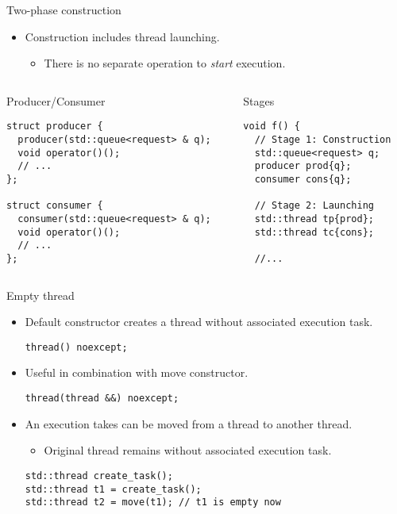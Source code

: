 \begin{frame}[t,fragile]{Two-phase construction}
\begin{itemize}
  \item Construction includes thread launching.
    \begin{itemize}
      \item There is no separate operation to \emph{start} execution.
    \end{itemize}
\end{itemize}
\begin{columns}

\begin{column}{.5\textwidth}
\begin{block}{Producer/Consumer}
\begin{lstlisting}
struct producer {
  producer(std::queue<request> & q);
  void operator()();
  // ...
};

struct consumer {
  consumer(std::queue<request> & q);
  void operator()();
  // ...
};
\end{lstlisting}
\end{block}
\end{column}

\begin{column}{.5\textwidth}
\begin{block}{Stages}
\begin{lstlisting}
void f() {
  // Stage 1: Construction
  std::queue<request> q;
  producer prod{q};
  consumer cons{q};

  // Stage 2: Launching
  std::thread tp{prod};
  std::thread tc{cons};

  //...
\end{lstlisting}
\end{block}
\end{column}

\end{columns}
\end{frame}

\begin{frame}[t,fragile]{Empty thread}
\begin{itemize}
  \item Default constructor creates a thread without associated execution task.
\begin{lstlisting}
thread() noexcept;
\end{lstlisting}
  \item Useful in combination with move constructor.
\begin{lstlisting}
thread(thread &&) noexcept;
\end{lstlisting}
  \item An execution takes can be moved from a thread to another thread.
    \begin{itemize}
      \item Original thread remains without associated execution task.
    \end{itemize}
\begin{lstlisting}
std::thread create_task();
std::thread t1 = create_task();
std::thread t2 = move(t1); // t1 is empty now
\end{lstlisting}
\end{itemize}
\end{frame}


